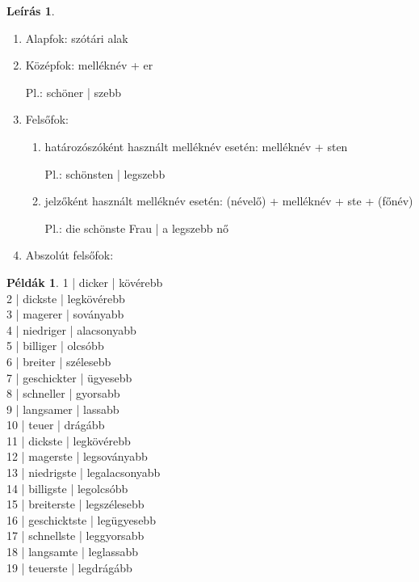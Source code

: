 \documentclass{article}
\theoremstyle{definition}
\newtheorem*{exmp}{Példák}
\newtheorem*{desc}{Leírás}
\begin{document}
\begin{desc}

\begin{enumerate}
\item Alapfok: szótári alak
\item Középfok: melléknév + er

Pl.: schöner | szebb

\item Felsőfok:
\begin{enumerate}
\item határozószóként használt melléknév esetén: melléknév + sten

Pl.: schönsten | legszebb

\item jelzőként használt melléknév esetén: (névelő) + melléknév + ste + (főnév)

Pl.: die schönste Frau | a legszebb nő
\end{enumerate}

\item Abszolút felsőfok:
\end{enumerate}
\end{desc}

\begin{exmp}
1 | dicker | kövérebb\\
2 | dickste | legkövérebb\\
3 | magerer | soványabb\\
4 | niedriger | alacsonyabb\\
5 | billiger | olcsóbb\\
6 | breiter | szélesebb\\
7 | geschickter | ügyesebb\\
8 | schneller | gyorsabb\\
9 | langsamer | lassabb\\
10 | teuer | drágább\\
11 | dickste | legkövérebb\\
12 | magerste | legsoványabb\\
13 | niedrigste | legalacsonyabb\\
14 | billigste | legolcsóbb\\
15 | breiterste | legszélesebb\\
16 | geschicktste | legügyesebb\\
17 | schnellste | leggyorsabb\\
18 | langsamte | leglassabb\\
19 | teuerste | legdrágább\\
\end{exmp}
\end{document}
